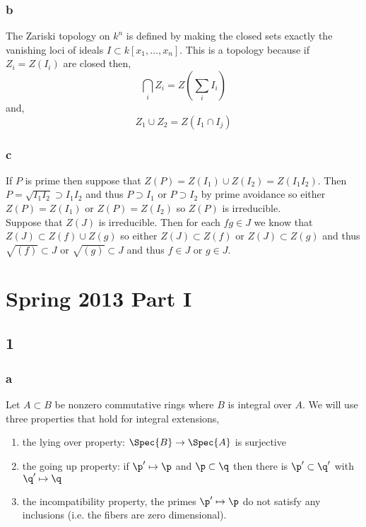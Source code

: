 \documentclass[12pt]{article}
\begin{document}
\subsubsection{b}

The Zariski topology on $k^n$ is defined by making the closed sets exactly the vanishing loci of ideals $I \subset k[x_1, \dots, x_n]$. This is a topology because if $Z_i = Z(I_i)$ are closed then,
\[ \bigcap_i Z_i = Z \left( \sum_i I_i \right) \]
and,
\[ Z_1 \cup Z_2 = Z(I_1 \cap I_j) \]

\subsubsection{c}

If $P$ is prime then suppose that $Z(P) = Z(I_1) \cup Z(I_2) = Z(I_1 I_2)$. Then $P = \sqrt{I_1 I_2} \supset I_1 I_2$ and thus $P \supset I_1$ or $P \supset I_2$ by prime avoidance so either $Z(P) = Z(I_1)$ or $Z(P) = Z(I_2)$ so $Z(P)$ is irreducible.
\bigskip\\
Suppose that $Z(J)$ is irreducible. Then for each $fg \in J$ we know that $Z(J) \subset Z(f) \cup Z(g)$ so either $Z(J) \subset Z(f)$ or $Z(J) \subset Z(g)$ and thus $\sqrt{(f)} \subset J$ or $\sqrt{(g)} \subset J$ and thus $f \in J$ or $g \in J$. 

\section{Spring 2013 Part I}


\subsection{1}

\subsubsection{a}

Let $A \subset B$ be nonzero commutative rings where $B$ is integral over $A$. We will use three properties that hold for integral extensions,
\begin{enumerate}
\item the lying over property: $\Spec{B} \to \Spec{A}$ is surjective
\item the going up property: if $\p' \mapsto \p$ and $\p \subset \q$ then there is $\p' \subset \q'$ with $\q' \mapsto \q$
\item the incompatibility property, the primes $\p' \mapsto \p$ do not satisfy any inclusions (i.e. the fibers are zero dimensional).
\end{enumerate}
\end{document}
